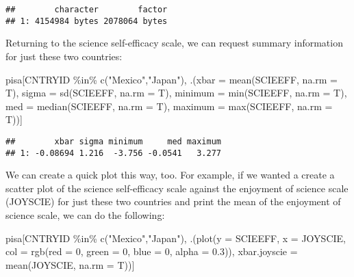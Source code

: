 \documentclass[
]{book}
\newenvironment{Shaded}{\begin{snugshade}}{\end{snugshade}}
\newcommand{\AttributeTok}[1]{\textcolor[rgb]{0.77,0.63,0.00}{#1}}
\newcommand{\DecValTok}[1]{\textcolor[rgb]{0.00,0.00,0.81}{#1}}
\newcommand{\FloatTok}[1]{\textcolor[rgb]{0.00,0.00,0.81}{#1}}
\newcommand{\FunctionTok}[1]{\textcolor[rgb]{0.00,0.00,0.00}{#1}}
\newcommand{\NormalTok}[1]{#1}
\newcommand{\SpecialCharTok}[1]{\textcolor[rgb]{0.00,0.00,0.00}{#1}}
\newcommand{\StringTok}[1]{\textcolor[rgb]{0.31,0.60,0.02}{#1}}
\begin{document}
\begin{verbatim}
##        character        factor
## 1: 4154984 bytes 2078064 bytes
\end{verbatim}

Returning to the science self-efficacy scale, we can request summary information for just these two countries:

\begin{Shaded}
\begin{Highlighting}[]
\NormalTok{pisa[CNTRYID }\SpecialCharTok{\%in\%} \FunctionTok{c}\NormalTok{(}\StringTok{"Mexico"}\NormalTok{,}\StringTok{"Japan"}\NormalTok{),}
\NormalTok{     .(}\AttributeTok{xbar =} \FunctionTok{mean}\NormalTok{(SCIEEFF, }\AttributeTok{na.rm =}\NormalTok{ T),}
       \AttributeTok{sigma =} \FunctionTok{sd}\NormalTok{(SCIEEFF, }\AttributeTok{na.rm =}\NormalTok{ T),}
       \AttributeTok{minimum =} \FunctionTok{min}\NormalTok{(SCIEEFF, }\AttributeTok{na.rm =}\NormalTok{ T),}
       \AttributeTok{med =} \FunctionTok{median}\NormalTok{(SCIEEFF, }\AttributeTok{na.rm =}\NormalTok{ T),}
       \AttributeTok{maximum =} \FunctionTok{max}\NormalTok{(SCIEEFF, }\AttributeTok{na.rm =}\NormalTok{ T))]}
\end{Highlighting}
\end{Shaded}

\begin{verbatim}
##        xbar sigma minimum     med maximum
## 1: -0.08694 1.216  -3.756 -0.0541   3.277
\end{verbatim}

We can create a quick plot this way, too. For example, if we wanted a create a scatter plot of the science self-efficacy scale against the enjoyment of science scale (JOYSCIE) for just these two countries and print the mean of the enjoyment of science scale, we can do the following:

\begin{Shaded}
\begin{Highlighting}[]
\NormalTok{pisa[CNTRYID }\SpecialCharTok{\%in\%} \FunctionTok{c}\NormalTok{(}\StringTok{"Mexico"}\NormalTok{,}\StringTok{"Japan"}\NormalTok{),}
\NormalTok{     .(}\FunctionTok{plot}\NormalTok{(}\AttributeTok{y =}\NormalTok{ SCIEEFF, }\AttributeTok{x =}\NormalTok{ JOYSCIE, }
            \AttributeTok{col =} \FunctionTok{rgb}\NormalTok{(}\AttributeTok{red =} \DecValTok{0}\NormalTok{, }\AttributeTok{green =} \DecValTok{0}\NormalTok{, }\AttributeTok{blue =} \DecValTok{0}\NormalTok{, }\AttributeTok{alpha =} \FloatTok{0.3}\NormalTok{)), }
       \AttributeTok{xbar.joyscie =} \FunctionTok{mean}\NormalTok{(JOYSCIE, }\AttributeTok{na.rm =}\NormalTok{ T))]}
\end{Highlighting}
\end{Shaded}
\end{document}
